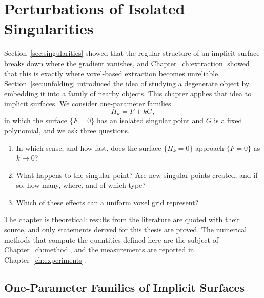 \chapter{Perturbations of Isolated Singularities}
\label{ch:theory}

Section~\ref{sec:singularities} showed that the regular structure of an
implicit surface breaks down where the gradient vanishes, and
Chapter~\ref{ch:extraction} showed that this is exactly where voxel-based extraction becomes
unreliable. Section~\ref{sec:unfolding} introduced the idea of studying a
degenerate object by embedding it into a family of nearby objects. This
chapter applies that idea to implicit surfaces. We consider one-parameter
families
\[
H_k = F + kG ,
\]
in which the surface $\{F=0\}$ has an isolated singular point and $G$ is a
fixed polynomial, and we ask three questions.
\begin{enumerate}
    \item[(Q1)] In which sense, and how fast, does the surface $\{H_k=0\}$
          approach $\{F=0\}$ as $k\to0$?
    \item[(Q2)] What happens to the singular point? Are new singular points
          created, and if so, how many, where, and of which type?
    \item[(Q3)] Which of these effects can a uniform voxel grid represent?
\end{enumerate}
The chapter is theoretical: results from the literature are quoted with their
source, and only statements derived for this thesis are proved. The numerical
methods that compute the quantities defined here are the subject of
Chapter~\ref{ch:method}, and the measurements are reported in
Chapter~\ref{ch:experiments}.

\section{One-Parameter Families of Implicit Surfaces}
\label{sec:families}

